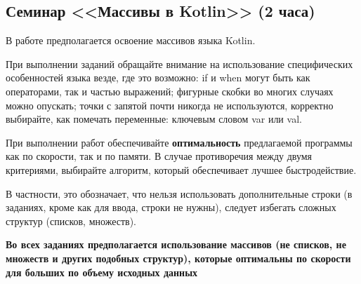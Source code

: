 \subsection{Семинар <<Массивы в Kotlin>> (2 часа)}

В работе предполагается освоение массивов языка Kotlin.

При выполнении заданий обращайте внимание на использование специфических особенностей языка везде, где это возможно: 
if и when могут быть как операторами, так и частью выражений; фигурные скобки во многих случаях можно опускать;
точки с запятой почти никогда не используются, корректно выбирайте, как помечать переменные: ключевым словом var или val.

При выполнении работ обеспечивайте \textbf{оптимальность} предлагаемой программы как по скорости, так и по памяти. В
случае противоречия между двумя критериями, выбирайте алгоритм, который обеспечивает лучшее быстродействие.

В частности, это обозначает, что нельзя использовать дополнительные строки (в заданиях, кроме как для ввода, строки не нужны),
следует избегать сложных структур (списков, множеств).

\textbf{Во всех заданиях предполагается использование массивов (не списков, не множеств и других подобных структур), которые оптимальны по скорости для больших по объему исходных данных}

